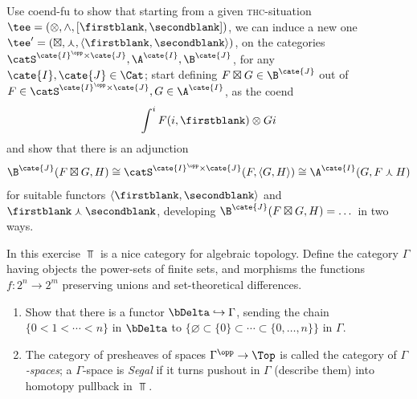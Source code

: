 \begin{exerciseset}
\begin{exercisepoints}
\item \label{ex4:lifted-thc} Use coend-fu to show that starting from a given \textsc{thc}-situation $\tee=(\otimes , \wedge, [\firstblank,\secondblank])$, we can induce a new one $\tee' = (\boxtimes, \curlywedge, \langle\firstblank,\secondblank\rangle )$, on the categories $\catS^{\cate{I}^\opp\times \cate{J}}, \A^\cate{I}, \B^\cate{J}$, for any $\cate{I}, \cate{J}\in\Cat$; start defining $F\boxtimes G\in \B^\cate{J}$ out of $F\in \catS^{\cate{I}^\opp\times \cate{J}}, G\in \A^\cate{I}$, as the coend 
\[
\int^i F(i, \firstblank)\otimes Gi
\] 
and show that there is an adjunction
\[
{\B^\cate{J}}(F\boxtimes G, H)\cong {\catS^{\cate{I}^\opp\times \cate{J}}}(F, \langle G,H\rangle )\cong {\A^\cate{I}}(G, F\curlywedge H)
\]
for suitable functors $\langle\firstblank,\secondblank\rangle$ and $\firstblank\curlywedge\secondblank$, developing ${\B^\cate{J}}(F\boxtimes G, H) = \dots$ in two ways.
\item In this exercise $\Top$ is a nice category for algebraic topology. Define the category $\Gamma$  having objects the power-sets of finite sets, and morphisms the functions $f\colon 2^n\to 2^m$ preserving unions and set-theoretical differences.
\begin{enumerate}
\item Show that there is a functor $\bDelta\hookrightarrow \Gamma$, sending the chain  $\{0<1<\cdots<n\}$ in $\bDelta$ to $\{\varnothing\subset \{0\}\subset\cdots\subset \{0,\dots,n\}\}$ in $\Gamma$.
\item The category of presheaves of spaces $\Gamma^\opp\to \Top$ is called the category of \emph{$\Gamma$-spaces}; a $\Gamma$-space is \emph{Segal} if it turns pushout in $\Gamma$ (describe them) into homotopy pullback in $\Top$.


\end{enumerate}
\end{exercisepoints}
\end{exerciseset}
